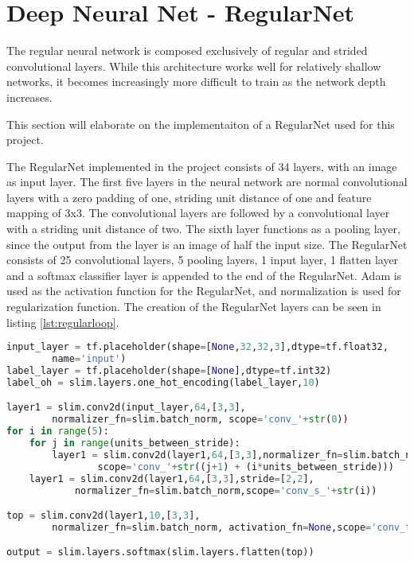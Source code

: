 \section{Deep Neural Net - RegularNet}
The regular neural network is composed exclusively of regular and strided convolutional layers. While this architecture works well for relatively shallow networks, it becomes increasingly more difficult to train as the network depth increases.

This section will elaborate on the implementaiton of a RegularNet used for this project.

The RegularNet implemented in the project consists of 34 layers, with an image as input layer. The first five layers in the neural network are normal convolutional layers with a zero padding of one, striding unit distance of one and feature mapping of 3x3. The convolutional layers are followed by a convolutional layer with a striding unit distance of two. The sixth layer functions as a pooling layer, since the output from the layer is an image of half the input size. The RegularNet consists of 25 convolutional layers, 5 pooling layers, 1 input layer, 1 flatten layer and a softmax classifier layer is appended to the end of the RegularNet. Adam is used as the activation function for the RegularNet, and normalization is used for regularization function. The creation of the RegularNet layers can be seen in listing \ref{lst:regularloop}.

\begin{lstlisting}[language=Python, label=lst:regularloop, caption=For loop that creates the layers in the RegularNet]
input_layer = tf.placeholder(shape=[None,32,32,3],dtype=tf.float32, 
		name='input')
label_layer = tf.placeholder(shape=[None],dtype=tf.int32)
label_oh = slim.layers.one_hot_encoding(label_layer,10)

layer1 = slim.conv2d(input_layer,64,[3,3],
		normalizer_fn=slim.batch_norm, scope='conv_'+str(0))
for i in range(5):
	for j in range(units_between_stride):
		layer1 = slim.conv2d(layer1,64,[3,3],normalizer_fn=slim.batch_norm, 
				scope='conv_'+str((j+1) + (i*units_between_stride)))
	layer1 = slim.conv2d(layer1,64,[3,3],stride=[2,2], 
			normalizer_fn=slim.batch_norm,scope='conv_s_'+str(i))

top = slim.conv2d(layer1,10,[3,3],
		normalizer_fn=slim.batch_norm, activation_fn=None,scope='conv_top')

output = slim.layers.softmax(slim.layers.flatten(top))
\end{lstlisting}

